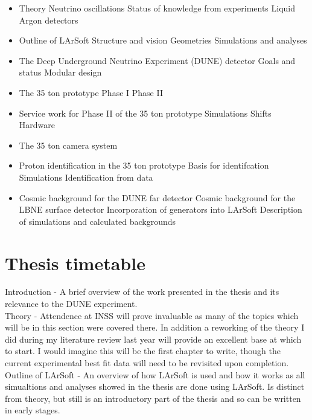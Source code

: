 \documentclass[11pt]{report} %
\begin{document}
{\begin{itemize}
\item Theory
  \subitem Neutrino oscillations
  \subitem Status of knowledge from experiments
  \subitem Liquid Argon detectors

\item Outline of LArSoft
  \subitem Structure and vision
  \subitem Geometries
  \subitem Simulations and analyses
  
\item The Deep Underground Neutrino Experiment (DUNE) detector
  \subitem Goals and status
  \subitem Modular design

\item The 35 ton prototype
  \subitem Phase I
  \subitem Phase II 
  
\item Service work for Phase II of the 35 ton prototype
  \subitem Simulations
  \subitem Shifts
  \subitem Hardware
  
\item The 35 ton camera system

\item Proton identification in the 35 ton prototype
  \subitem Basis for identifcation
  \subitem Simulations
  \subitem Identification from data
  
\item Cosmic background for the DUNE far detector
  \subitem Cosmic background for the LBNE surface detector
  \subitem Incorporation of generators into LArSoft
  \subitem Description of simulations and calculated backgrounds
    
\end{itemize}

\section{Thesis timetable}
Introduction - A brief overview of the work presented in the thesis and its relevance to the DUNE experiment.\\

Theory - Attendence at INSS will prove invaluable as many of the topics which will be in this section were covered there. In addition a reworking of the theory I did during my literature review last year will provide an excellent base at which to start. I would imagine this will be the first chapter to write, though the current experimental best fit data will need to be revisited upon completion.\\

Outline of LArSoft - An overview of how LArSoft is used and how it works as all simualtions and analyses showed in the thesis are done using LArSoft. Is distinct from theory, but still is an introductory part of the thesis and so can be written in early stages. \\

}
\end{document}
